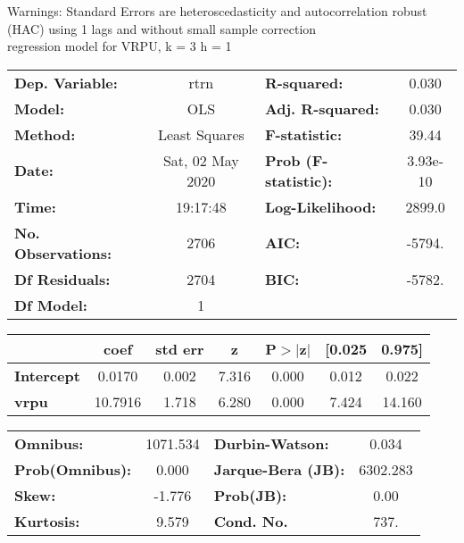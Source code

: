 Warnings: \newline
 [1] Standard Errors are heteroscedasticity and autocorrelation robust (HAC) using 1 lags and without small sample correction\\ 

regression model for VRPU, k = 3 h = 1\begin{center}
\begin{tabular}{lclc}
\toprule
\textbf{Dep. Variable:}    &       rtrn       & \textbf{  R-squared:         } &     0.030   \\
\textbf{Model:}            &       OLS        & \textbf{  Adj. R-squared:    } &     0.030   \\
\textbf{Method:}           &  Least Squares   & \textbf{  F-statistic:       } &     39.44   \\
\textbf{Date:}             & Sat, 02 May 2020 & \textbf{  Prob (F-statistic):} &  3.93e-10   \\
\textbf{Time:}             &     19:17:48     & \textbf{  Log-Likelihood:    } &    2899.0   \\
\textbf{No. Observations:} &        2706      & \textbf{  AIC:               } &    -5794.   \\
\textbf{Df Residuals:}     &        2704      & \textbf{  BIC:               } &    -5782.   \\
\textbf{Df Model:}         &           1      & \textbf{                     } &             \\
\bottomrule
\end{tabular}
\begin{tabular}{lcccccc}
                   & \textbf{coef} & \textbf{std err} & \textbf{z} & \textbf{P$> |$z$|$} & \textbf{[0.025} & \textbf{0.975]}  \\
\midrule
\textbf{Intercept} &       0.0170  &        0.002     &     7.316  &         0.000        &        0.012    &        0.022     \\
\textbf{vrpu}      &      10.7916  &        1.718     &     6.280  &         0.000        &        7.424    &       14.160     \\
\bottomrule
\end{tabular}
\begin{tabular}{lclc}
\textbf{Omnibus:}       & 1071.534 & \textbf{  Durbin-Watson:     } &    0.034  \\
\textbf{Prob(Omnibus):} &   0.000  & \textbf{  Jarque-Bera (JB):  } & 6302.283  \\
\textbf{Skew:}          &  -1.776  & \textbf{  Prob(JB):          } &     0.00  \\
\textbf{Kurtosis:}      &   9.579  & \textbf{  Cond. No.          } &     737.  \\
\bottomrule
\end{tabular}
\end{center}


